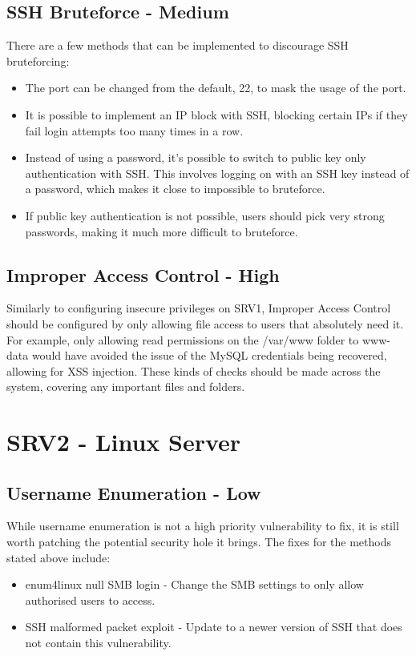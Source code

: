 \documentclass{report}
\begin{document}
\subsection{SSH Bruteforce - Medium}
There are a few methods that can be implemented to discourage SSH bruteforcing:
\begin{itemize}
	\item The port can be changed from the default, 22, to mask the usage of the port.
	\item It is possible to implement an IP block with SSH, blocking certain IPs if they fail login attempts too many times in a row.
	\item Instead of using a password, it's possible to switch to public key only authentication with SSH. This involves logging on with an SSH key instead of a password, which makes it close to impossible to bruteforce.
	\item If public key authentication is not possible, users should pick very strong passwords, making it much more difficult to bruteforce.
\end{itemize}
\subsection{Improper Access Control - High}
Similarly to configuring insecure privileges on SRV1, Improper Access Control should be configured by only allowing file access to users that absolutely need it. For example, only allowing read permissions on the /var/www folder to www-data would have avoided the issue of the MySQL credentials being recovered, allowing for XSS injection. These kinds of checks should be made across the system, covering any important files and folders.

\section{SRV2 - Linux Server}
\subsection{Username Enumeration - Low}
While username enumeration is not a high priority vulnerability to fix, it is still worth patching the potential security hole it brings. The fixes for the methods stated above include:
\begin{itemize}
	\item enum4linux null SMB login - Change the SMB settings to only allow authorised users to access.
	\item SSH malformed packet exploit - Update to a newer version of SSH that does not contain this vulnerability.
\end{itemize}
\end{document}

